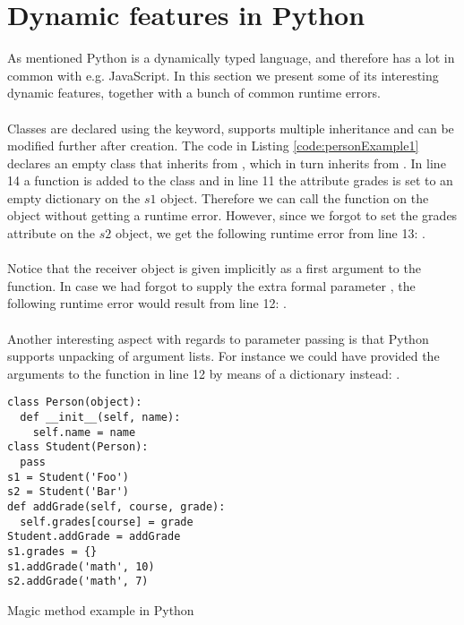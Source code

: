 \chapter{Dynamic features in Python}
As mentioned Python is a dynamically typed language, and therefore has a lot in common with e.g. JavaScript. In this section we present some of its interesting dynamic features, together with a bunch of common runtime errors. \\
\\
Classes are declared using the  keyword, supports multiple inheritance and can be modified further after creation. The code in  Listing \ref{code:personExample1} declares an empty  class that inherits from , which in turn inherits from . In line 14 a function  is added to the  class and in line 11 the attribute grades is set to an empty dictionary on the $s1$ object. Therefore we can call the  function on the  object without getting a runtime error. However, since we forgot to set the grades attribute on the $s2$ object, we get the following runtime error from line 13: . \\
\\
Notice that the receiver object is given implicitly as a first argument to the  function. In case we had forgot to supply the extra formal parameter , the following runtime error would result from line 12: . \\
\\
Another interesting aspect with regards to parameter passing is that Python supports unpacking of argument lists. For instance we could have provided the arguments to the  function in line 12 by means of a dictionary instead: .


\begin{listing}[H]
	\begin{verbatim}
class Person(object):
  def __init__(self, name):
    self.name = name
class Student(Person):
  pass
s1 = Student('Foo')
s2 = Student('Bar')
def addGrade(self, course, grade):
  self.grades[course] = grade
Student.addGrade = addGrade
s1.grades = {}
s1.addGrade('math', 10)
s2.addGrade('math', 7)
	\end{verbatim}
	\caption{Magic method example in Python}\label{code:personExample1}
\end{listing}

